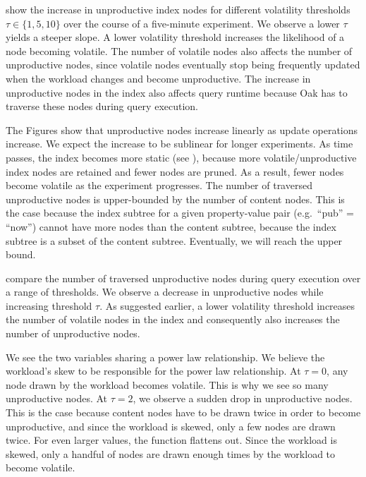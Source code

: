 \documentclass[abstracton,12pt]{scrartcl}
\theoremstyle{definition}
\begin{document}
show the increase in unproductive index nodes for different
volatility thresholds $\tau \in \{1,5,10\}$ over the course of a five-minute experiment.
We observe a lower $\tau$ yields a steeper slope.
A lower volatility threshold increases the likelihood of a node
becoming volatile. The number of volatile nodes also affects the number of
unproductive nodes, since volatile nodes eventually stop being frequently
updated when the workload changes and become unproductive. 
The increase in unproductive nodes in the index
also affects query runtime because Oak has to traverse these nodes during
query execution.

The Figures show that unproductive nodes increase linearly as update operations
increase. We expect the increase to be sublinear for longer experiments.
As time passes, the index becomes more static (see ), 
because more volatile/unproductive
index nodes are retained and fewer nodes are pruned. As a result, fewer nodes
become volatile as the experiment progresses.
The number of traversed unproductive nodes is upper-bounded by the number 
of content nodes.
This is the case because the index subtree for a given property-value pair
(e.g.\ ``pub'' = ``now'') cannot have
more nodes than the content subtree, because the index subtree is a subset
of the content subtree.
Eventually, we will reach the upper bound.

 compare the
number of traversed unproductive nodes during query execution over a range of
thresholds. We observe a decrease in unproductive nodes while increasing
threshold $\tau$. 
As suggested earlier, a lower volatility threshold
increases the number of volatile nodes in the index and consequently also
increases the number of unproductive nodes. 

We see the two variables sharing a power law relationship. We believe the
workload's skew to be responsible for the power law relationship. 
At $\tau = 0$, any node drawn by the workload becomes volatile. This is why we
see so many unproductive nodes. At $\tau = 2$, we observe a sudden drop in 
unproductive nodes. This is the case because content nodes have to be drawn twice in order
to become unproductive, and since the workload is skewed, only a few nodes are
drawn twice. For even larger values, the function flattens out. Since the workload
is skewed, only a handful of nodes are drawn enough times by the workload to become volatile.
\end{document}
